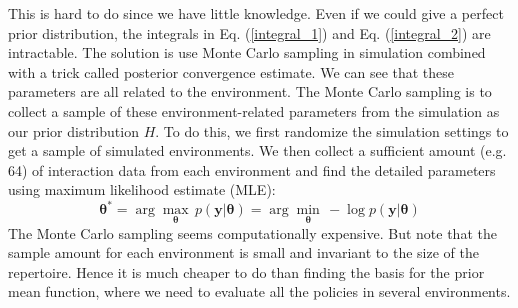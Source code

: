 This is hard to do since we have little knowledge.
Even if we could give a perfect prior distribution, the integrals in Eq. (\ref{integral_1}) and Eq. (\ref{integral_2}) are intractable.
The solution is use Monte Carlo sampling in simulation combined with a trick called posterior convergence estimate.
We can see that these parameters are all related to the environment.
The Monte Carlo sampling is to collect a sample of these environment-related parameters from the simulation as our prior distribution $H$.
To do this, we first randomize the simulation settings to get a sample of simulated environments.
We then collect a sufficient amount (e.g. 64) of interaction data from each environment and find the detailed parameters using maximum likelihood estimate (MLE):
\begin{equation}
\bm{\theta}^* = 
\arg \max_{\bm{\theta}} \, p(\bm{y}|\bm{\theta})
= \arg \min_{\bm{\theta}} \, -\log p(\bm{y}|\bm{\theta})
\label{MLE}
\end{equation}
The Monte Carlo sampling seems computationally expensive. But note that the sample amount for each environment is small and invariant to the size of the repertoire.
Hence it is much cheaper to do than finding the basis for the prior mean function, where we need to evaluate all the policies in several environments.


